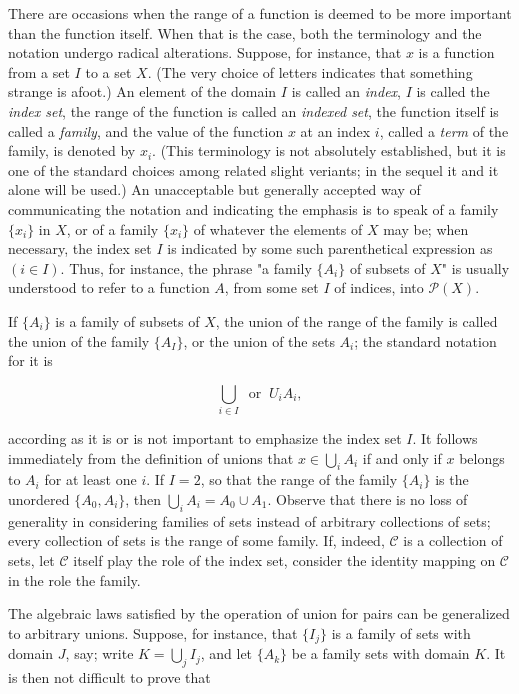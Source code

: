 There are occasions when the range of a function is deemed to be more important than the function itself. When that is the case, both the terminology and the notation undergo radical alterations. Suppose, for instance, that $x$ is a function from a set $I$ to a set $X$. (The very choice of letters indicates that something strange is afoot.) An element of the domain $I$ is called an \textit{index}, $I$ is called the \textit{index set}, the range of the function is called an \textit{indexed set}, the function itself is called a \textit{family}, and the value of the function $x$ at an index $i$, called a \textit{term} of the family, is denoted by $x_{i}$. (This terminology is not absolutely established, but it is one of the standard choices among related slight veriants; in the sequel it and it alone will be used.) An unacceptable but generally accepted way of communicating the notation and indicating the emphasis is to speak of a family $\{ x_{i}  \}$ in $X$, or of a family $\{ x_{i} \}$ of whatever the elements of $X$ may be; when necessary, the index set $I$ is indicated by some such parenthetical expression as $(i \in I)$. Thus, for instance, the phrase "a family $\{ A_{i} \}$ of subsets of $X$" is usually understood to refer to a function $A$, from some set $I$ of indices, into $\mathcal{P}(X)$. 

If $ \{ A_{i} \}$ is a family of subsets of $X$, the union of the range of the family is called the union of the family $\{ A_{I} \}$, or the union of the sets $A_{i}$; the standard notation for it is

\begin{equation*}
\bigcup_{i \in I} \: \text{ or } \: U_{i}A_{i},
\end{equation*}

according as it is or is not important to emphasize the index set $I$. It follows immediately from the definition of unions that $x \in \bigcup_{i} A_{i}$ if and only if $x$ belongs to $A_{i}$ for at least one $i$. If $I = 2$, so that the range of the family $\{ A_{i} \}$ is the unordered $\{ A_{0}, A_{i} \} $, then $\bigcup_{i}A_{i} =  A_{0} \cup A_{1}$. Observe that there is no loss of generality in considering families of sets instead of arbitrary collections of sets; every collection of sets is the range of some family. If, indeed, $\mathcal{C}$ is a collection of sets, let $\mathcal{C}$ itself play the role of the index set, consider the identity mapping on $\mathcal{C}$ in the role the family. 

The algebraic laws satisfied by the operation of union for pairs can be generalized to arbitrary unions. Suppose, for instance, that $ \{ I_{j} \}$ is a family of sets with domain $J$, say; write $K = \bigcup_{j}I_{j}$, and let $\{ A_{k} \}$ be a family sets with domain $K$. It is then not difficult to prove that 

